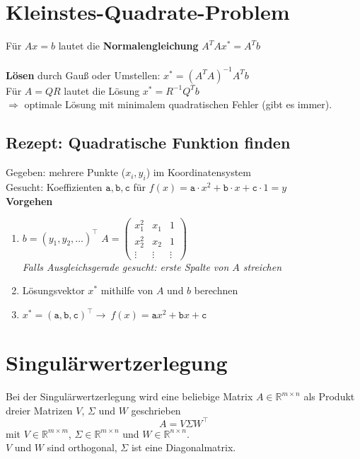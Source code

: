 \documentclass[german, 6pt]{latex4ei/latex4ei_sheet}
\begin{document}
\section{Kleinstes-Quadrate-Problem}
Für $Ax = b$ lautet die
\textbf{Normalengleichung}
$A^TAx^* = A^Tb$\\
\\
\textbf{Lösen} durch Gauß oder Umstellen: $x^* = (A^TA)^{-1}A^Tb$\\
Für  $A=QR$ lautet die Lösung $x^* = R^{-1}Q^Tb$\\
$\Rightarrow$ optimale Lösung mit minimalem quadratischen Fehler (gibt es immer).
\begin{minipage}{\columnwidth}
\subsection{Rezept: Quadratische Funktion finden}
Gegeben: mehrere Punkte ($x_i, y_i$) im Koordinatensystem\\
Gesucht: Koeffizienten $\mathtt{a}, \mathtt{b}, \mathtt{c}$ für $f(x)=\mathtt{a}\cdot x^2+\mathtt{b}\cdot x+\mathtt{c}\cdot 1=y$\\
\textbf{Vorgehen}
\begin{enumerate}
\item $b = (y_1, y_2, \dots)^\top$ \qquad $A = \begin{pmatrix}
x_1^2 & x_1 & 1 \\[3pt]
x_2^2 & x_2 & 1 \\[3pt]
\vdots & \vdots & \vdots
\end{pmatrix}$ \\
\textit{Falls Ausgleichsgerade gesucht: erste Spalte von $A$ streichen}
\item Lösungsvektor $x^*$ mithilfe von $A$ und $b$ berechnen
\item $x^*=(\mathtt{a}, \mathtt{b}, \mathtt{c})^\top \rightarrow \ f(x)=\mathtt{a}x^2+\mathtt{b}x+\mathtt{c}$
\end{enumerate}
\end{minipage}
\section{Singulärwertzerlegung}
Bei der Singulärwertzerlegung wird eine beliebige Matrix $A\in \mathbb{R}^{m\times n}$ als Produkt dreier Matrizen $V$, $\Sigma$ und $W$ geschrieben
\begin{equation*}
A=V\Sigma W^\top
\end{equation*}
mit $V\in \mathbb{R}^{m\times m}$, $\Sigma\in \mathbb{R}^{m\times n}$ und $W\in \mathbb{R}^{n\times n}$.\\
$V$ und $W$ sind orthogonal, $\Sigma$ ist eine Diagonalmatrix.
\end{document}
